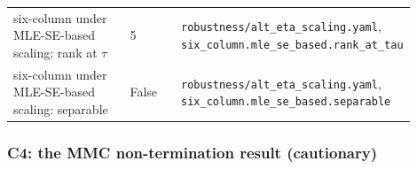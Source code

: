\begin{longtable}{p{0.35\linewidth} p{0.14\linewidth} p{0.41\linewidth}}
six-column under MLE-SE-based scaling: rank at $\tau$ & 5 & \texttt{\footnotesize robustness/alt\_\allowbreak{}eta\_\allowbreak{}scaling.\allowbreak{}yaml}, \texttt{\footnotesize six\_\allowbreak{}column.\allowbreak{}mle\_\allowbreak{}se\_\allowbreak{}based.\allowbreak{}rank\_\allowbreak{}at\_\allowbreak{}tau} \\
six-column under MLE-SE-based scaling: separable & False & \texttt{\footnotesize robustness/alt\_\allowbreak{}eta\_\allowbreak{}scaling.\allowbreak{}yaml}, \texttt{\footnotesize six\_\allowbreak{}column.\allowbreak{}mle\_\allowbreak{}se\_\allowbreak{}based.\allowbreak{}separable} \\
\bottomrule
\end{longtable}

\subsubsection*{C4: the MMC non-termination result (cautionary)}
